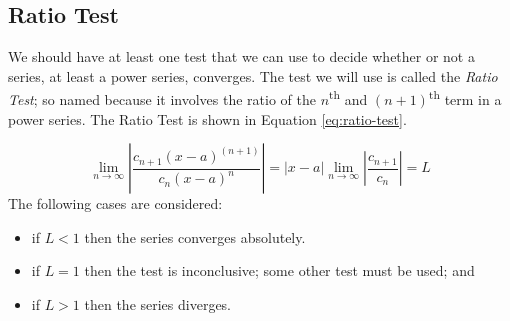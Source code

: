 \subsection{Ratio Test}
We should have at least one test that we can use to decide whether or not a series, at least a power series, converges.  The test we will use is called the \emph{Ratio Test}; so named because it involves the ratio of the $n$\textsuperscript{th} and $(n+1)$\textsuperscript{th} term in a power series.  The Ratio Test is shown in Equation \ref{eq:ratio-test}.

\begin{equation}
\lim_{n \to \infty}\left|\frac{c_{n+1}(x-a)^{(n+1)}}{c_n(x-a)^n} \right| = \left|x-a \right| \lim_{n \to \infty} \left|\frac{c_{n+1}}{c_n} \right| = L
\label{eq:ratio-test}
\end{equation}
The following cases are considered:
\begin{itemize}
\item if $L<1$ then the series converges absolutely.
\item if $L = 1$ then the test is inconclusive; some other test must be used; and
\item if $L > 1$ then the series diverges.
\end{itemize}




